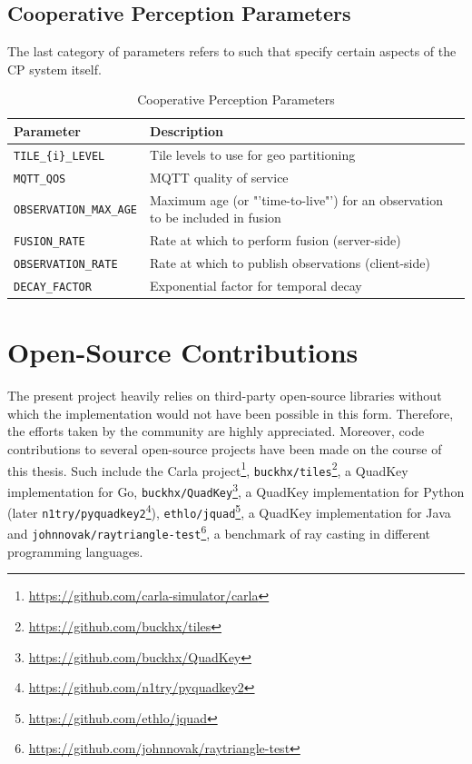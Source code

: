 \subsection{Cooperative Perception Parameters}
\label{subsec:implementation:cooperative_perception_parameters}
The last category of parameters refers to such that specify certain aspects of the CP system itself.

\begin{table}[H]
	\centering
	\begin{tabular}{|p{7.6cm}|p{7.6cm}|}
		\hline
		\textbf{Parameter} & \textbf{Description} \\ \hline
		\texttt{TILE\_\{i\}\_LEVEL} & Tile levels to use for geo partitioning \\ \hline
		\texttt{MQTT\_QOS} & MQTT quality of service \\ \hline
		\texttt{OBSERVATION\_MAX\_AGE} & Maximum age (or "'time-to-live"') for an observation to be included in fusion \\ \hline
		\texttt{FUSION\_RATE} & Rate at which to perform fusion (server-side) \\ \hline
		\texttt{OBSERVATION\_RATE} & Rate at which to publish observations (client-side) \\ \hline
		\texttt{DECAY\_FACTOR} & Exponential factor for temporal decay \\ \hline
	\end{tabular}
	\caption{Cooperative Perception Parameters}
	\label{tab:cooperative_perception_parameters}
\end{table}

\section{Open-Source Contributions}
\label{sec:implementation:open_source_contributions}
The present project heavily relies on third-party open-source libraries without which the implementation would not have been possible in this form. Therefore, the efforts taken by the community are highly appreciated. Moreover, code contributions to several open-source projects have been made on the course of this thesis. Such include the Carla project\footnote{\url{https://github.com/carla-simulator/carla}}, \texttt{buckhx/tiles}\footnote{\url{https://github.com/buckhx/tiles}}, a QuadKey implementation for Go, \texttt{buckhx/QuadKey}\footnote{\url{https://github.com/buckhx/QuadKey}}, a QuadKey implementation for Python (later \texttt{n1try/pyquadkey2}\footnote{\url{https://github.com/n1try/pyquadkey2}}), \texttt{ethlo/jquad}\footnote{\url{https://github.com/ethlo/jquad}}, a QuadKey implementation for Java and \texttt{johnnovak/raytriangle-test}\footnote{\url{https://github.com/johnnovak/raytriangle-test}}, a benchmark of ray casting in different programming languages.

